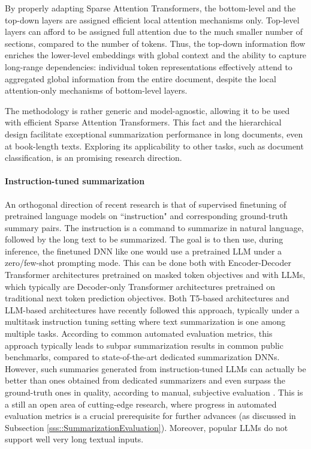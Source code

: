 \documentclass[preprint,review,10pt]{elsarticle}
\begin{document}
	By properly adapting Sparse Attention Transformers, the bottom-level and the top-down layers are assigned efficient local attention mechanisms only. Top-level layers can afford to be assigned full attention due to the much smaller number of sections, compared to the number of tokens. Thus, the top-down information flow enriches the lower-level embeddings with global context and the ability to capture long-range dependencies: individual token representations effectively attend to aggregated global information from the entire document, despite the local attention-only mechanisms of bottom-level layers.
	
	The methodology is rather generic and model-agnostic, allowing it to be used with efficient Sparse Attention Transformers. This fact and the hierarchical design facilitate exceptional summarization performance in long documents, even at book-length texts. Exploring its applicability to other tasks, such as document classification, is an promising research direction.
	
	\paragraph{Instruction-tuned summarization} An orthogonal direction of recent research is that of supervised finetuning of pretrained language models on ``instruction" and corresponding ground-truth summary pairs. The instruction is a command to summarize in natural language, followed by the long text to be summarized. The goal is to then use, during inference, the finetuned DNN like one would use a pretrained LLM under a zero/few-shot prompting mode. This can be done both with Encoder-Decoder Transformer architectures pretrained on masked token objectives and with LLMs, which typically are Decoder-only Transformer architectures pretrained on traditional next token prediction objectives. Both T5-based architectures \cite{victor2022multitask} \cite{chung2022scaling} and LLM-based architectures \cite{ouyang2022training} \cite{iyer2022opt} \cite{muennighoff2022crosslingual} have recently followed this approach, typically under a multitask instruction tuning setting where text summarization is one among multiple tasks. According to common automated evaluation metrics, this approach typically leads to subpar summarization results in common public benchmarks, compared to state-of-the-art dedicated summarization DNNs. However, such summaries generated from instruction-tuned LLMs can actually be better than ones obtained from dedicated summarizers and even surpass the ground-truth ones in quality, according to manual, subjective evaluation \cite{goyal2022news}. This is a still an open area of cutting-edge research, where progress in automated evaluation metrics is a crucial prerequisite for further advances (as discussed in Subsection \ref{sss::SummarizationEvaluation}). Moreover, popular LLMs do not support well very long textual inputs.
	
\end{document}
